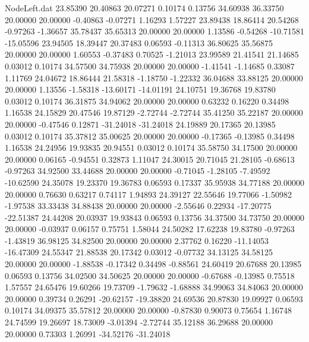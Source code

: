 \begin{filecontents}{NodeLeft.dat}
  23.85390   20.40863   20.07271     0.10174    0.13756   34.60938   36.33750   20.00000   20.00000   -0.40863   -0.07271    1.16293    1.57227
  23.89438   18.86414   20.54268    -0.97263   -1.36657   35.78437   35.65313   20.00000   20.00000    1.13586   -0.54268  -10.71581  -15.05596
  23.94505   18.39447   20.37483     0.06593   -0.11313   36.80625   35.56875   20.00000   20.00000    1.60553   -0.37483    0.70525   -1.21013
  23.99589   21.41541   21.14685     0.03012    0.10174   34.57500   34.75938   20.00000   20.00000   -1.41541   -1.14685    0.33087    1.11769
  24.04672   18.86444   21.58318    -1.18750   -1.22332   36.04688   33.88125   20.00000   20.00000    1.13556   -1.58318  -13.60171  -14.01191
  24.10751   19.36768   19.83780     0.03012    0.10174   36.31875   34.94062   20.00000   20.00000    0.63232    0.16220    0.34498    1.16538
  24.15829   20.47546   19.87129    -2.72744   -2.72744   35.41250   35.22187   20.00000   20.00000   -0.47546    0.12871  -31.24018  -31.24018
  24.19889   20.17365   20.13985     0.03012    0.10174   35.37812   35.00625   20.00000   20.00000   -0.17365   -0.13985    0.34498    1.16538
  24.24956   19.93835   20.94551     0.03012    0.10174   35.58750   34.17500   20.00000   20.00000    0.06165   -0.94551    0.32873    1.11047
  24.30015   20.71045   21.28105    -0.68613   -0.97263   34.92500   33.44688   20.00000   20.00000   -0.71045   -1.28105   -7.49592  -10.62590
  24.35078   19.23370   19.36783     0.06593    0.17337   35.95938   34.77188   20.00000   20.00000    0.76630    0.63217    0.74117    1.94893
  24.39127   22.55646   19.77066    -1.50982   -1.97538   33.33438   34.88438   20.00000   20.00000   -2.55646    0.22934  -17.20775  -22.51387
  24.44208   20.03937   19.93843     0.06593    0.13756   34.37500   34.73750   20.00000   20.00000   -0.03937    0.06157    0.75751    1.58044
  24.50282   17.62238   19.83780    -0.97263   -1.43819   36.98125   34.82500   20.00000   20.00000    2.37762    0.16220  -11.14053  -16.47309
  24.55347   21.88538   20.17342     0.03012   -0.07732   34.13125   34.58125   20.00000   20.00000   -1.88538   -0.17342    0.34498   -0.88561
  24.60419   20.67688   20.13985     0.06593    0.13756   34.02500   34.50625   20.00000   20.00000   -0.67688   -0.13985    0.75518    1.57557
  24.65476   19.60266   19.73709    -1.79632   -1.68888   34.99063   34.84063   20.00000   20.00000    0.39734    0.26291  -20.62157  -19.38820
  24.69536   20.87830   19.09927     0.06593    0.10174   34.09375   35.57812   20.00000   20.00000   -0.87830    0.90073    0.75654    1.16748
  24.74599   19.26697   18.73009    -3.01394   -2.72744   35.12188   36.29688   20.00000   20.00000    0.73303    1.26991  -34.52176  -31.24018

\end{filecontents}
